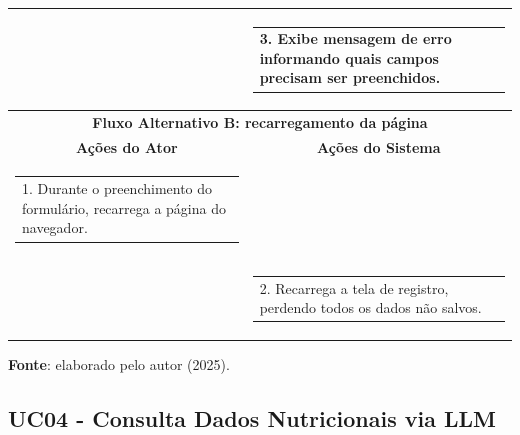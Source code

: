 \begin{longtable}[c]{|p{}|p{}|}
\multicolumn{1}{|p{0.48\textwidth}|}{} &
  \begin{tabular}[c]{@{}p{}@{}}3. Exibe mensagem de erro informando quais campos precisam ser preenchidos.\end{tabular} \\ \hline
\multicolumn{2}{|c|}{\textbf{Fluxo Alternativo B: recarregamento da página}} \\ \hline
\multicolumn{1}{|c|}{\textbf{Ações do Ator}} &
  \multicolumn{1}{c|}{\textbf{Ações do Sistema}} \\ \hline
\multicolumn{1}{|p{0.48\textwidth}|}{\begin{tabular}[c]{@{}p{}@{}}1. Durante o preenchimento do formulário, recarrega a página do navegador.\end{tabular}} & \\ \hline
\multicolumn{1}{|p{0.48\textwidth}|}{} &
  \begin{tabular}[c]{@{}p{}@{}}2. Recarrega a tela de registro, perdendo todos os dados não salvos.\end{tabular} \\ \hline
\end{longtable}
\begin{center}
    \small{\textbf{Fonte}: elaborado pelo autor (2025).}
\end{center}


\subsection{UC04 - Consulta Dados Nutricionais via LLM}

